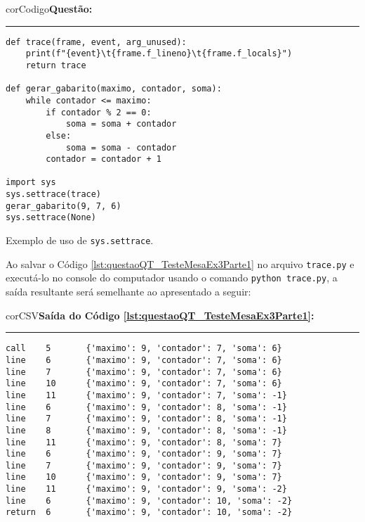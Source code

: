 \begin{listing}[!ht]\vspace{-3mm}
\begin{myboxCode}{corCodigo}{\textbf{Questão: }}\vspace{3mm}
\hrule
\begin{verbatim}
def trace(frame, event, arg_unused):
    print(f"{event}\t{frame.f_lineno}\t{frame.f_locals}")
    return trace

def gerar_gabarito(maximo, contador, soma):
    while contador <= maximo:
        if contador % 2 == 0:
            soma = soma + contador
        else:
            soma = soma - contador
        contador = contador + 1

import sys
sys.settrace(trace)
gerar_gabarito(9, 7, 6)
sys.settrace(None)
\end{verbatim}
\end{myboxCode}
\caption{Exemplo de uso de \texttt{sys.settrace}.}\vspace{-2mm}
\label{lst:questaoQT_TesteMesaEx3Parte1}
\end{listing}\vspace{-5mm}

Ao salvar o Código \ref{lst:questaoQT_TesteMesaEx3Parte1} no arquivo \verb|trace.py| e executá-lo no console do computador usando o comando \verb|python trace.py|, a saída resultante será semelhante ao apresentado a seguir:%

\begin{myboxCode}{corCSV}{\textbf{Saída do Código \ref{lst:questaoQT_TesteMesaEx3Parte1}:}}\vspace{3mm}
\hrule
\begin{verbatim}
call    5       {'maximo': 9, 'contador': 7, 'soma': 6}
line    6       {'maximo': 9, 'contador': 7, 'soma': 6}
line    7       {'maximo': 9, 'contador': 7, 'soma': 6}
line    10      {'maximo': 9, 'contador': 7, 'soma': 6}
line    11      {'maximo': 9, 'contador': 7, 'soma': -1}
line    6       {'maximo': 9, 'contador': 8, 'soma': -1}
line    7       {'maximo': 9, 'contador': 8, 'soma': -1}
line    8       {'maximo': 9, 'contador': 8, 'soma': -1}
line    11      {'maximo': 9, 'contador': 8, 'soma': 7}
line    6       {'maximo': 9, 'contador': 9, 'soma': 7}
line    7       {'maximo': 9, 'contador': 9, 'soma': 7}
line    10      {'maximo': 9, 'contador': 9, 'soma': 7}
line    11      {'maximo': 9, 'contador': 9, 'soma': -2}
line    6       {'maximo': 9, 'contador': 10, 'soma': -2}
return  6       {'maximo': 9, 'contador': 10, 'soma': -2}
\end{verbatim}
\end{myboxCode}

